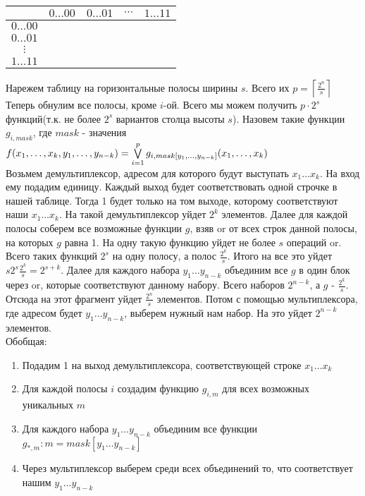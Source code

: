 \documentclass[12pt]{article}
\begin{document}
\begin{center}
    \begin{tabular}{c|cccc}
        & $0\ldots00$ & $0\ldots01$ & $\cdots$ & $1\ldots11$\\
        \hline
        $0\ldots00$ & & & & \\
        $0\ldots01$ & & & & \\
        $\vdots$ & & & & \\
        $1\ldots11$ & & & &
    \end{tabular}
\end{center}
Нарежем таблицу на горизонтальные полосы ширины $s$. Всего их $p=\left\lceil \frac {2^n}s \right\rceil$\\
Теперь обнулим все полосы, кроме $i$-ой. Всего мы можем получить $p\cdot 2^s$ функций(т.к. не более $2^s$ вариантов столца высоты $s$). Назовем такие функции $g_{i,mask}$, где $mask$ - значения\\
$f(x_1,\ldots,x_k,y_1,\ldots,y_{n-k})=\bigvee\limits_{i=1}^p g_{i,mask[y_1,\ldots,y_{n-k}]}(x_1,\ldots,x_k)$\\
Возьмем демультиплексор, адресом для которого будут выступать $x_1\ldots x_k$. На вход ему подадим единицу. Каждый выход будет соответствовать одной строчке в нашей таблице. Тогда 1 будет только на том выходе, которому соответствуют наши $x_1\ldots x_k$. На такой демультиплексор уйдет $2^k$ элементов. Далее для каждой полосы соберем все возможные функции $g$, взяв or от всех строк данной полосы, на которых $g$ равна 1. На одну такую функцию уйдет не более $s$ операций or. Всего таких функций $2^s$ на одну полосу, а полос $\frac{2^k}s$. Итого на все это уйдет $s2^s\frac{2^k}s = 2^{s+k}$. Далее для каждого набора $y_1\ldots y_{n-k}$ объединим все $g$ в один блок через or, которые соответствуют данному набору. Всего наборов $2^{n-k}$, а $g$ - $\frac{2^k}s$. Отсюда на этот фрагмент уйдет $\frac{2^n}s$ элементов. Потом с помощью мультиплексора, где адресом будет $y_1\ldots y_{n-k}$, выберем нужный нам набор. На это уйдет $2^{n-k}$ элементов.\\
Обобщая:
\begin{enumerate}
    \item Подадим 1 на выход демультиплексора, соответствующей строке $x_1\ldots x_k$
    \item Для каждой полосы $i$ создадим функцию $g_{i,m}$ для всех возможных уникальных $m$
    \item Для каждого набора $y_1\ldots y_{n-k}$ объединим все функции $g_{*,m}: m = mask[y_1\ldots y_{n-k}]$
    \item Через мультиплексор выберем среди всех объединений то, что соответствует нашим $y_1\ldots y_{n-k}$
\end{enumerate}
\end{document}
